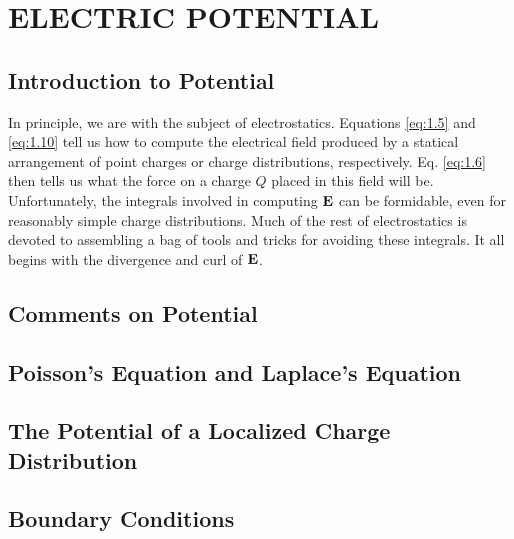 \chapter{ELECTRIC POTENTIAL}\label{ch:3}

\section{Introduction to Potential}\label{sec:3.1} 

In principle, we are  with the subject of electrostatics. Equations \ref{eq:1.5} and \ref{eq:1.10} tell us how to compute the electrical field produced by a statical arrangement of point charges or charge distributions, respectively. Eq. \ref{eq:1.6} then tells us what the force on a charge $Q$ placed in this field will be. Unfortunately, the integrals involved in computing $\vb{E}$ can be formidable, even for reasonably simple charge distributions. Much of the rest of electrostatics is devoted to assembling a bag of tools and tricks for avoiding these integrals. It all begins with the divergence and curl of $\vb{E}$.





\section{Comments on Potential}\label{sec:3.2}

\section{Poisson's Equation and Laplace's Equation}\label{sec:3.3}

\section{The Potential of a Localized Charge Distribution}\label{sec:3.4}

\section{Boundary Conditions}\label{sec:3.5}

 
